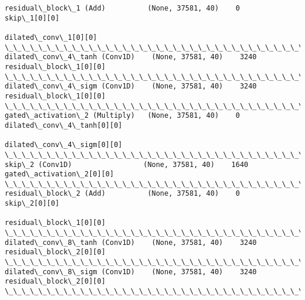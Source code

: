 \documentclass[11pt]{article}
\begin{document}
\begin{Verbatim}[commandchars=\\\{\}]
residual\_block\_1 (Add)          (None, 37581, 40)    0           skip\_1[0][0]                     
                                                                 dilated\_conv\_1[0][0]             
\_\_\_\_\_\_\_\_\_\_\_\_\_\_\_\_\_\_\_\_\_\_\_\_\_\_\_\_\_\_\_\_\_\_\_\_\_\_\_\_\_\_\_\_\_\_\_\_\_\_\_\_\_\_\_\_\_\_\_\_\_\_\_\_\_\_\_\_\_\_\_\_\_\_\_\_\_\_\_\_\_\_\_\_\_\_\_\_\_\_\_\_\_\_\_\_\_\_
dilated\_conv\_4\_tanh (Conv1D)    (None, 37581, 40)    3240        residual\_block\_1[0][0]           
\_\_\_\_\_\_\_\_\_\_\_\_\_\_\_\_\_\_\_\_\_\_\_\_\_\_\_\_\_\_\_\_\_\_\_\_\_\_\_\_\_\_\_\_\_\_\_\_\_\_\_\_\_\_\_\_\_\_\_\_\_\_\_\_\_\_\_\_\_\_\_\_\_\_\_\_\_\_\_\_\_\_\_\_\_\_\_\_\_\_\_\_\_\_\_\_\_\_
dilated\_conv\_4\_sigm (Conv1D)    (None, 37581, 40)    3240        residual\_block\_1[0][0]           
\_\_\_\_\_\_\_\_\_\_\_\_\_\_\_\_\_\_\_\_\_\_\_\_\_\_\_\_\_\_\_\_\_\_\_\_\_\_\_\_\_\_\_\_\_\_\_\_\_\_\_\_\_\_\_\_\_\_\_\_\_\_\_\_\_\_\_\_\_\_\_\_\_\_\_\_\_\_\_\_\_\_\_\_\_\_\_\_\_\_\_\_\_\_\_\_\_\_
gated\_activation\_2 (Multiply)   (None, 37581, 40)    0           dilated\_conv\_4\_tanh[0][0]        
                                                                 dilated\_conv\_4\_sigm[0][0]        
\_\_\_\_\_\_\_\_\_\_\_\_\_\_\_\_\_\_\_\_\_\_\_\_\_\_\_\_\_\_\_\_\_\_\_\_\_\_\_\_\_\_\_\_\_\_\_\_\_\_\_\_\_\_\_\_\_\_\_\_\_\_\_\_\_\_\_\_\_\_\_\_\_\_\_\_\_\_\_\_\_\_\_\_\_\_\_\_\_\_\_\_\_\_\_\_\_\_
skip\_2 (Conv1D)                 (None, 37581, 40)    1640        gated\_activation\_2[0][0]         
\_\_\_\_\_\_\_\_\_\_\_\_\_\_\_\_\_\_\_\_\_\_\_\_\_\_\_\_\_\_\_\_\_\_\_\_\_\_\_\_\_\_\_\_\_\_\_\_\_\_\_\_\_\_\_\_\_\_\_\_\_\_\_\_\_\_\_\_\_\_\_\_\_\_\_\_\_\_\_\_\_\_\_\_\_\_\_\_\_\_\_\_\_\_\_\_\_\_
residual\_block\_2 (Add)          (None, 37581, 40)    0           skip\_2[0][0]                     
                                                                 residual\_block\_1[0][0]           
\_\_\_\_\_\_\_\_\_\_\_\_\_\_\_\_\_\_\_\_\_\_\_\_\_\_\_\_\_\_\_\_\_\_\_\_\_\_\_\_\_\_\_\_\_\_\_\_\_\_\_\_\_\_\_\_\_\_\_\_\_\_\_\_\_\_\_\_\_\_\_\_\_\_\_\_\_\_\_\_\_\_\_\_\_\_\_\_\_\_\_\_\_\_\_\_\_\_
dilated\_conv\_8\_tanh (Conv1D)    (None, 37581, 40)    3240        residual\_block\_2[0][0]           
\_\_\_\_\_\_\_\_\_\_\_\_\_\_\_\_\_\_\_\_\_\_\_\_\_\_\_\_\_\_\_\_\_\_\_\_\_\_\_\_\_\_\_\_\_\_\_\_\_\_\_\_\_\_\_\_\_\_\_\_\_\_\_\_\_\_\_\_\_\_\_\_\_\_\_\_\_\_\_\_\_\_\_\_\_\_\_\_\_\_\_\_\_\_\_\_\_\_
dilated\_conv\_8\_sigm (Conv1D)    (None, 37581, 40)    3240        residual\_block\_2[0][0]           
\_\_\_\_\_\_\_\_\_\_\_\_\_\_\_\_\_\_\_\_\_\_\_\_\_\_\_\_\_\_\_\_\_\_\_\_\_\_\_\_\_\_\_\_\_\_\_\_\_\_\_\_\_\_\_\_\_\_\_\_\_\_\_\_\_\_\_\_\_\_\_\_\_\_\_\_\_\_\_\_\_\_\_\_\_\_\_\_\_\_\_\_\_\_\_\_\_\_

\end{Verbatim}
\end{document}
